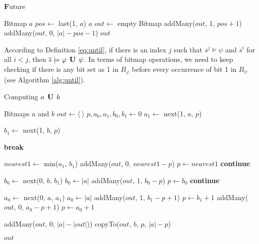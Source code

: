 \begin{algorithm}
\caption{\textbf{F}uture}
\label{alg:future}
\begin{algorithmic}[1]
\Require Bitmap $a$
\State $pos \gets$ last(1, $a$)
  \State \Return $a$
\Else
  \State $out \gets$ empty Bitmap
  \State addMany($out$, 1, $pos + 1$)
  \State addMany($out$, 0, $|a| - pos - 1$)
  \State \Return $out$
\EndIf
\end{algorithmic}
\end{algorithm}

According to Definition \eqref{eq:until}, if there is an index $j$ such that $\overline{s}^j \models \psi$ and $\overline{s}^i$ for all $i < j$, then $\overline{s}\models \varphi\mathrel{\mbox{\,\textbf{U}}}\,\psi$. In terms of bitmap operations, we need to keep checking if there is any bit set as 1 in $B_{\varphi}$ before every occurrence of bit 1 in $B_{\psi}$ (see Algorithm \ref{alg:until}).

\begin{algorithm}
\caption{Computing $a \mathrel{\mbox{\,\textbf{U}}}\, b$}
\label{alg:until}
\begin{multicols}{2}
\begin{algorithmic}[1]
\Require Bitmaps $a$ and $b$
\State $out \gets \langle~\rangle$
\State $p, a_0, a_1, b_0, b_1 \gets 0$
    \State $a_1 \gets$ next(1, $a$, $p$)
  \EndIf

    \State $b_1 \gets$ next(1, $b$, $p$)
  \EndIf

    \State \textbf{break}
  \EndIf

  \State $nearest1 \gets$ min($a_1$, $b_1$)
    \State addMany($out$, 0, $nearest1 - p$)
    \State $p \gets nearest1$
    \State \textbf{continue}
  \EndIf

      \State $b_0 \gets$ next(0, $b$, $b_1$)
        \State $b_0 \gets |a|$
      \EndIf
    \EndIf
    \State addMany($out$, 1, $b_0 - p$)
    \State $p \gets b_0$
    \State \textbf{continue}
  \EndIf

    \State $a_0 \gets$ next(0, $a$, $a_1$)
      \State $a_0 \gets |a|$
    \EndIf
  \EndIf
    \State addMany($out$, 1, $b_1 - p + 1$)
    \State $p \gets b_1 + 1$
  \Else
    \State addMany($out$, 0, $a_0 - p + 1$)
    \State $p \gets a_0 + 1$
  \EndIf
\EndWhile

  \State addMany($out$, 0, $|a| - |out|$))
  \State copyTo($out$, $b$, $p$, $|a| - p$)
\EndIf

\State \Return $out$
\end{algorithmic}
  \end{multicols}
\end{algorithm}


